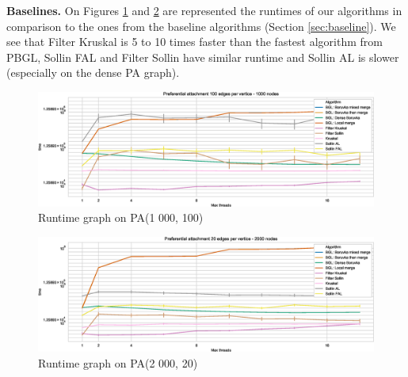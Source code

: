 \documentclass[letterpaper]{article}
\newcommand{\mypar}[1]{{\bf #1.}}
\begin{document}
\mypar{Baselines} On Figures \ref{baseline1} and \ref{baseline2} are represented the runtimes of our algorithms in comparison to the ones from the baseline algorithms (Section \ref{sec:baseline}). We see that Filter Kruskal is 5 to 10 times faster than the fastest algorithm from PBGL, Sollin FAL and Filter Sollin have similar runtime and Sollin AL is slower (especially on the dense PA graph).

\begin{figure}\centering
  \includegraphics[width=\linewidth]{graphics/Graph_runtime_Preferential_attachment_100_edges_per_vertice_1000.eps}
  \caption{Runtime graph on PA(1 000, 100)\label{baseline1}}
\end{figure}

\begin{figure}\centering
  \includegraphics[width=\linewidth]{graphics/Graph_runtime_Preferential_attachment_20_edges_per_vertice_2000.eps}
  \caption{Runtime graph on PA(2 000, 20)\label{baseline2}}
\end{figure}
\end{document}
